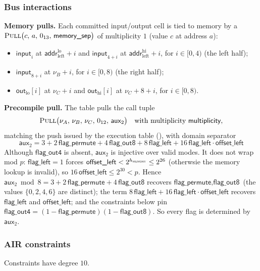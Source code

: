 \documentclass{article}
\theoremstyle{definition}
\begin{document}
\subsubsection{Bus interactions}
\textbf{Memory pulls.} Each committed input/output cell is tied to memory by a $\textsc{Pull}\big(c,\, a,\, 0_{13},\, \textsf{memory\_sep}\big)$ of multiplicity $1$ (value $c$ at address $a$):
\begin{itemize}
    \item $\textsf{input}_i$ at $\textsf{addr}^\text{lo}_\text{left} + i$ and $\textsf{input}_{4+i}$ at $\textsf{addr}^\text{hi}_\text{left} + i$, for $i \in [0, 4)$ (the left half);
    \item $\textsf{input}_{8+i}$ at $\nu_B + i$, for $i \in [0, 8)$ (the right half);
    \item $\textsf{out}_\text{lo}[i]$ at $\nu_C + i$ and $\textsf{out}_\text{hi}[i]$ at $\nu_C + 8 + i$, for $i \in [0, 8)$.
\end{itemize}

\textbf{Precompile pull.} The table pulls the call tuple
\[
\textsc{Pull}\big(\nu_A,\, \nu_B,\, \nu_C,\, 0_{12},\, \textsf{aux}_2\big) \quad \text{with multiplicity } \textsf{multiplicity},
\]
matching the push issued by the execution table (), with domain separator
\[
\textsf{aux}_2 = 3 + 2\,\textsf{flag\_permute} + 4\,\textsf{flag\_out8} + 8\,\textsf{flag\_left} + 16\,\textsf{flag\_left} \cdot \textsf{offset\_left}
\]
Although $\textsf{flag\_out4}$ is absent, $\textsf{aux}_2$ is injective over valid modes. It does not wrap mod $p$: $\textsf{flag\_left} = 1$ forces $\textsf{offset\_left} < 2^{h_\textsc{memory}} \leq 2^{26}$ (otherwsie the memory lookup is invalid), so $16\,\textsf{offset\_left} \leq 2^{30} < p$. Hence $\textsf{aux}_2 \bmod 8 = 3 + 2\,\textsf{flag\_permute} + 4\,\textsf{flag\_out8}$ recovers $\textsf{flag\_permute}, \textsf{flag\_out8}$ (the values $\{0,2,4,6\}$ are distinct); the term $8\,\textsf{flag\_left} + 16\,\textsf{flag\_left} \cdot \textsf{offset\_left}$ recovers $\textsf{flag\_left}$ and $\textsf{offset\_left}$; and the constraints below pin $\textsf{flag\_out4} = (1 - \textsf{flag\_permute})(1 - \textsf{flag\_out8})$. So every flag is determined by $\textsf{aux}_2$.

\subsubsection{AIR constraints}

Constraints have degree $10$.
\end{document}
